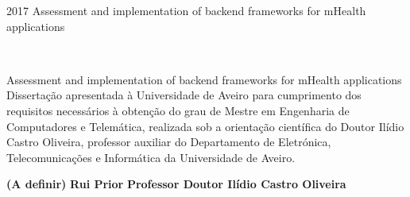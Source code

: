 \documentclass[11pt,twoside,a4paper]{report}
\def\ThesisYear{2017}
\begin{document}
%
%

\TitlePage
  \HEADER{\BAR\FIG{}}
         {\ThesisYear}
      \TITLE{}{}
      \TITLE{}{}
  \TITLE{}
        {\textsf{Assessment and implementation of backend frameworks for mHealth applications}}

\EndTitlePage
\titlepage\ \endtitlepage %


%
%

\TitlePage
  \HEADER{}{\ThesisYear}
      \TITLE{}{}
      \TITLE{}{}
  \TITLE{}
        {\textsf{Assessment and implementation of backend frameworks for mHealth applications}}
  \vspace*{15mm}
  \TEXT{}
       {Disserta\c c\~ao apresentada \`a Universidade de Aveiro para cumprimento dos requisitos necess\'arios \`a obten\c c\~ao do
        grau de Mestre em Engenharia de Computadores e Telem\'atica, realizada sob a orienta\c c\~ao cient\'ifica do Doutor Il\'idio Castro Oliveira, professor auxiliar do Departamento de Eletr\'onica, Telecomunica\c c\~oes e Inform\'atica da Universidade de Aveiro.}
\EndTitlePage
\titlepage\ \endtitlepage %


\TitlePage
  \vspace*{55mm}
       {}
       {\textbf{(A definir)}}
  \vspace*{5mm}
       {\textbf{Rui Prior}}
  \vspace*{5mm}
  \TEXT{}
       {\textbf{Professor Doutor Ilídio Castro Oliveira}}
\EndTitlePage
\titlepage\ \endtitlepage %
\end{document}
